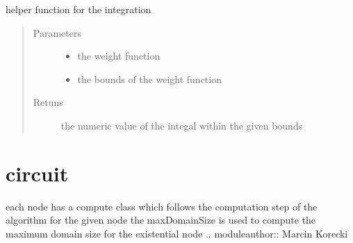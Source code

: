 \documentclass[letterpaper,10pt,english,openany,oneside]{sphinxmanual}
\begin{document}

\begin{fulllineitems}
\label{\detokenize{index:term.symbolicToNumeric}}
helper function for the integration
\begin{quote}\begin{description}
\item[{Parameters}] \leavevmode\begin{itemize}
\item {} 
 \textendash{} the weight function

\item {} 
 \textendash{} the bounds of the weight function

\end{itemize}

\item[{Retuns}] \leavevmode
the numeric value of the integal within the given bounds

\end{description}\end{quote}

\end{fulllineitems}



\section{circuit}
\label{\detokenize{index:module-circuit}}\label{\detokenize{index:circuit}}\label{\detokenize{index:module-1}}
each node has a compute class which follows the computation step of the algorithm for the given node
the maxDomainSize is used to compute the maximum domain size for the existential node
.. moduleauthor:: Marcin Korecki
\end{document}
